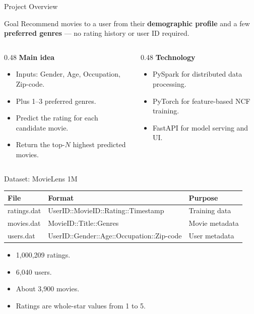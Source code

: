 \documentclass[aspectratio=169]{beamer}
\begin{document}
\begin{frame}{Project Overview}
\begin{block}{Goal}
Recommend movies to a user from their \textbf{demographic profile} and a few
\textbf{preferred genres} --- no rating history or user ID required.
\end{block}

\vspace{0.2cm}

\begin{columns}
  \begin{column}{0.48\textwidth}
    \textbf{Main idea}
    \begin{itemize}
      \item Inputs: Gender, Age, Occupation, Zip-code.
      \item Plus 1--3 preferred genres.
      \item Predict the rating for each candidate movie.
      \item Return the top-$N$ highest predicted movies.
    \end{itemize}
  \end{column}
  \begin{column}{0.48\textwidth}
    \textbf{Technology}
    \begin{itemize}
      \item PySpark for distributed data processing.
      \item PyTorch for feature-based NCF training.
      \item FastAPI for model serving and UI.
    \end{itemize}
  \end{column}
\end{columns}
\end{frame}

\begin{frame}{Dataset: MovieLens 1M}
\begin{table}
\centering
\begin{tabular}{lll}
\toprule
\textbf{File} & \textbf{Format} & \textbf{Purpose} \\
\midrule
ratings.dat & UserID::MovieID::Rating::Timestamp & Training data \\
movies.dat & MovieID::Title::Genres & Movie metadata \\
users.dat & UserID::Gender::Age::Occupation::Zip-code & User metadata \\
\bottomrule
\end{tabular}
\end{table}

\vspace{0.3cm}

\begin{itemize}
  \item 1,000,209 ratings.
  \item 6,040 users.
  \item About 3,900 movies.
  \item Ratings are whole-star values from 1 to 5.
\end{itemize}
\end{frame}
\end{document}
